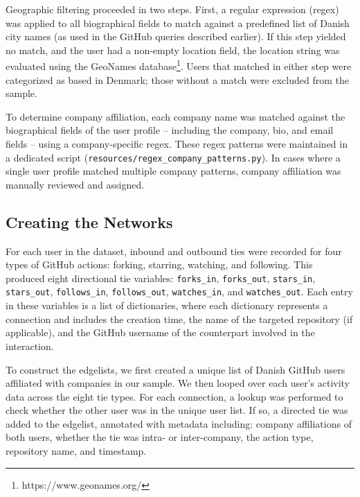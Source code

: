Geographic filtering proceeded in two steps. First, a regular expression (regex) was applied to all biographical fields to match against a predefined list of Danish city names (as used in the GitHub queries described earlier). If this step yielded no match, and the user had a non-empty location field, the location string was evaluated using the GeoNames database\footnote{https://www.geonames.org/}. Users that matched in either step were categorized as based in Denmark; those without a match were excluded from the sample.

To determine company affiliation, each company name was matched against the biographical fields of the user profile -- including the company, bio, and email fields -- using a company-specific regex. These regex patterns were maintained in a dedicated script (\texttt{resources/regex\_company\_patterns.py}). In cases where a single user profile matched multiple company patterns, company affiliation was manually reviewed and assigned.


\subsection{Creating the Networks}

For each user in the dataset, inbound and outbound ties were recorded for four types of GitHub actions: forking, starring, watching, and following. This produced eight directional tie variables: \texttt{forks\_in}, \texttt{forks\_out}, \texttt{stars\_in}, \texttt{stars\_out}, \texttt{follows\_in}, \texttt{follows\_out}, \texttt{watches\_in}, and \texttt{watches\_out}. Each entry in these variables is a list of dictionaries, where each dictionary represents a connection and includes the creation time, the name of the targeted repository (if applicable), and the GitHub username of the counterpart involved in the interaction.

To construct the edgelists, we first created a unique list of Danish GitHub users affiliated with companies in our sample. We then looped over each user’s activity data across the eight tie types. For each connection, a lookup was performed to check whether the other user was in the unique user list. If so, a directed tie was added to the edgelist, annotated with metadata including: company affiliations of both users, whether the tie was intra- or inter-company, the action type, repository name, and timestamp.

